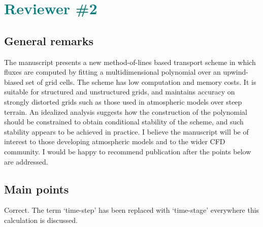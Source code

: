 \documentclass[times]{elsarticle}
\newcommand{\revtwo}[1]{\textcolor{teal}{\textbf{#1}}}
\begin{document}
\section*{\revtwo{Reviewer \#2}}

\subsection*{General remarks}

The manuscript presents a new method-of-lines based transport scheme
in which fluxes are computed by fitting a multidimensional
polynomial over an upwind-biased set of grid cells. The scheme
has low computation and memory costs. It is suitable for
structured and unstructured grids, and maintains accuracy
on strongly distorted grids such as those used in atmospheric models
over steep terrain. An idealized analysis suggests how the
construction of the polynomial should be constrained to obtain
conditional stability of the scheme, and such stability appears
to be achieved in practice.
I believe the manuscript will be of interest to those developing
atmospheric models and to the wider CFD community. I would be happy to
recommend publication after the points below are addressed.


\subsection*{Main points}

\begin{quotation}
\begin{comment}
\setcounter{commenti}{0}
\item It is claimed (in several places) that the scheme requires `just one
vector multiply per face per time step'. Since the two-stage Heun scheme
(2) is used, surely the cost must be two vector multiplies per face per time
step (or, more generally, one vector multiply per face per {\it stage})?
\end{comment}
\end{quotation}
Correct.  The term `time-step' has been replaced with `time-stage' everywhere this calculation is discussed.
\end{document}
